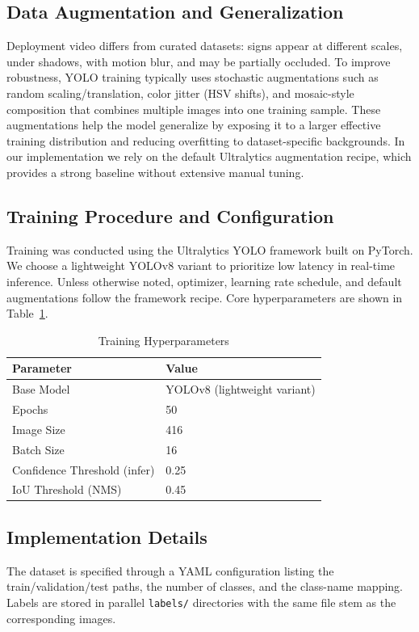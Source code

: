 \documentclass[conference]{IEEEtran}
\begin{document}
\subsection{Data Augmentation and Generalization}
Deployment video differs from curated datasets: signs appear at different scales, under shadows, with motion blur, and may be partially occluded. To improve robustness, YOLO training typically uses stochastic augmentations such as random scaling/translation, color jitter (HSV shifts), and mosaic-style composition that combines multiple images into one training sample. These augmentations help the model generalize by exposing it to a larger effective training distribution and reducing overfitting to dataset-specific backgrounds. In our implementation we rely on the default Ultralytics augmentation recipe, which provides a strong baseline without extensive manual tuning.

\subsection{Training Procedure and Configuration}
Training was conducted using the Ultralytics YOLO framework built on PyTorch. We choose a lightweight YOLOv8 variant to prioritize low latency in real-time inference. Unless otherwise noted, optimizer, learning rate schedule, and default augmentations follow the framework recipe. Core hyperparameters are shown in Table~\ref{tab:trainingparameters}.

\begin{table}[H]
\centering
\caption{Training Hyperparameters}
\label{tab:trainingparameters}
\begin{tabular}{ll}
\toprule
\textbf{Parameter} & \textbf{Value} \\
\midrule
Base Model & YOLOv8 (lightweight variant) \\
Epochs & 50 \\
Image Size & 416 \\
Batch Size & 16 \\
Confidence Threshold (infer) & 0.25 \\
IoU Threshold (NMS) & 0.45 \\
\bottomrule
\end{tabular}
\end{table}

\subsection{Implementation Details}
The dataset is specified through a YAML configuration listing the train/validation/test paths, the number of classes, and the class-name mapping. Labels are stored in parallel \texttt{labels/} directories with the same file stem as the corresponding images.
\end{document}
